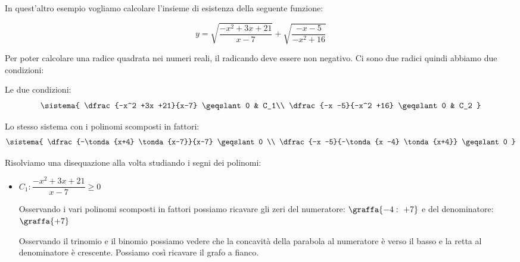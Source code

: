 \begin{esempio}
 
In quest'altro esempio vogliamo calcolare l'insieme di esistenza della 
seguente funzione:

\[y = \sqrt{\dfrac{-x^2 +3x +21}{x-7}} + \sqrt{\dfrac{-x -5}{-x^2 +16}}
\]

Per poter calcolare una radice quadrata nei numeri reali, il radicando deve 
essere non negativo. Ci sono due radici quindi abbiamo due condizioni:

\begin{minipage}{.49 \linewidth}
Le due condizioni:
 \[\sistema{
    \dfrac{-x^2 +3x +21}{x-7} \geqslant 0 & C_1\\
    \dfrac{-x -5}{-x^2 +16} \geqslant 0 & C_2
  }
\]
\end{minipage}
\begin{minipage}{.49 \linewidth}
Lo stesso sistema con i polinomi scomposti in fattori:
\[\sistema{
    \dfrac{-\tonda{x+4} \tonda{x-7}}{x-7} \geqslant 0 \\
    \dfrac{-x -5}{-\tonda{x -4} \tonda{x+4}} \geqslant 0
  }
\]
\end{minipage}

\newpage %

Risolviamo una disequazione alla volta studiando i segni dei polinomi:

\begin{itemize}
 \item \(C_1: \dfrac{-x^2 +3x +21}{x-7} \geqslant 0\)

Osservando i vari polinomi scomposti in fattori possiamo ricavare gli zeri 
del numeratore: \(\graffa{-4:~+7}\) e del denominatore: \(\graffa{+7}\)

\begin{minipage}{.49\textwidth}
Osservando il trinomio e il binomio possiamo vedere che la concavità della 
parabola al numeratore è verso il basso e la retta al 
denominatore è crescente. Possiamo così ricavare il grafo a fianco.
\end{minipage}
\hfill
\begin{minipage}{.49\textwidth}
\begin{center} \segnosistemaba \end{center}
\end{minipage}



\end{itemize}
\end{esempio}
